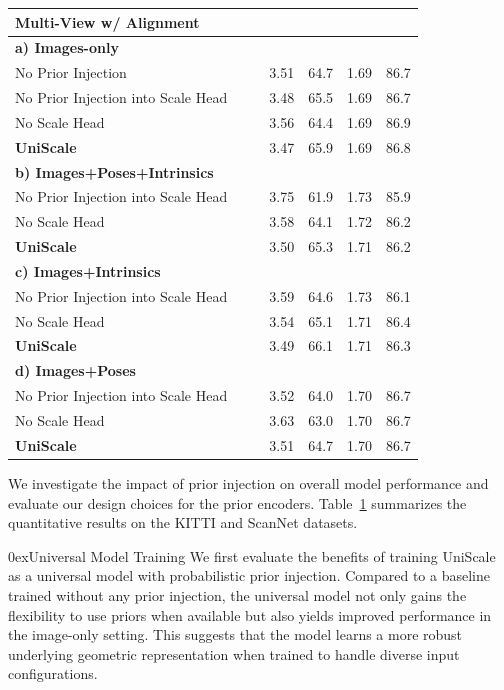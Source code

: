 \documentclass[letterpaper, 10 pt, conference]{ieeeconf}  %
\makeatletter
\newcommand{\cmark}{\ding{51}}
\newcommand{\xmark}{\ding{55}}
\renewcommand{\paragraph}{\@startsection{paragraph}{4}{2\parindent}{0ex plus 0.1ex minus 0.1ex}%
{0ex}{\normalfont\normalsize\bfseries}}
\makeatother
\begin{document}
\begin{table}[t]
\begin{tabular}{p{3.4cm}p{0.1cm}p{0.3cm}p{0.5cm}p{0.5cm}p{0.5cm}p{0.3cm}}
\multicolumn{7}{l}{\textbf{Multi-View w/ Alignment}} \\
\hline 
\multicolumn{7}{l}{\textbf{a) Images-only}} \\
No Prior Injection & \xmark & \xmark  & 3.51 & 64.7 & 1.69 & 86.7\\
No Prior Injection into Scale Head & \xmark & \xmark  & 3.48 & 65.5 & 1.69 & 86.7\\
No Scale Head & \xmark & \xmark  & 3.56 & 64.4  & 1.69 & 86.9\\
\textbf{UniScale} & \xmark & \xmark & 3.47 & 65.9 & 1.69 & 86.8 \\
\hline
\multicolumn{7}{l}{\textbf{b) Images+Poses+Intrinsics}} \\
No Prior Injection into Scale Head & \cmark & \cmark  & 3.75 & 61.9 & 1.73 & 85.9\\
No Scale Head & \cmark & \cmark  &  3.58 & 64.1 & 1.72 & 86.2 \\
\textbf{UniScale} & \cmark & \cmark & 3.50 & 65.3 & 1.71 & 86.2\\
\hline
\multicolumn{7}{l}{\textbf{c) Images+Intrinsics}} \\
No Prior Injection into Scale Head & \cmark & \xmark  & 3.59 & 64.6 & 1.73 & 86.1\\
No Scale Head & \cmark & \xmark  & 3.54 & 65.1 & 1.71 & 86.4\\
\textbf{UniScale} & \cmark & \xmark & 3.49 & 66.1 & 1.71 & 86.3 \\


\hline
\multicolumn{7}{l}{\textbf{d) Images+Poses}} \\
No Prior Injection into Scale Head & \xmark & \cmark  & 3.52 & 64.0 & 1.70 & 86.7\\
No Scale Head & \xmark & \cmark  &3.63 & 63.0 &1.70 & 86.7\\
\textbf{UniScale} & \xmark & \cmark & 3.51 & 64.7 &1.70 & 86.7 \\

\hline

\end{tabular}
\label{tab:ablation_prior}
\vspace{-4mm}
\end{table}


We investigate the impact of prior injection on overall model performance and evaluate our design choices for the prior encoders. Table~\ref{tab:ablation_prior} summarizes the quantitative results on the KITTI and ScanNet datasets.

\paragraph{Universal Model Training} We first evaluate the benefits of training UniScale as a universal model with probabilistic prior injection. Compared to a baseline trained without any prior injection, the universal model not only gains the flexibility to use priors when available but also yields improved performance in the image-only setting. This suggests that the model learns a more robust underlying geometric representation when trained to handle diverse input configurations.
\end{document}
